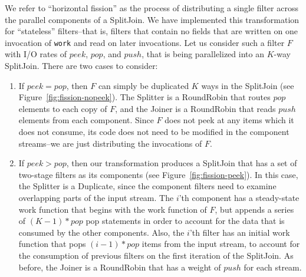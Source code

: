 We refer to ``horizontal fission'' as the process of distributing a
single filter across the parallel components of a SplitJoin.  We have
implemented this transformation for ``stateless'' filters--that is,
filters that contain no fields that are written on one invocation of
{\tt work} and read on later invocations.  Let us consider such a
filter $F$ with I/O rates of $peek$, $pop$, and $push$, that is being
parallelized into an $K$-way SplitJoin.  There are two cases to
consider:
\begin{enumerate}
\item If {\bf $peek = pop$}, then $F$ can simply be duplicated $K$
ways in the SplitJoin (see Figure~\ref{fig:fission-nopeek}).  The
Splitter is a RoundRobin that routes $pop$ elements to each copy of
$F$, and the Joiner is a RoundRobin that reads $push$ elements from
each component.  Since $F$ does not peek at any items which it does
not consume, its code does not need to be modified in the component
streams--we are just distributing the invocations of $F$.

\item If {\bf $peek > pop$}, then our transformation produces a
SplitJoin that has a set of two-stage filters as its components (see
Figure~\ref{fig:fission-peek}).  In this case, the Splitter is a
Duplicate, since the component filters need to examine overlapping
parts of the input stream.  The $i$'th component has a steady-state
work function that begins with the work function of $F$, but appends a
series of $(K-1)*pop$ pop statements in order to account for the data
that is consumed by the other components.  Also, the $i$'th filter has
an initial work function that pops $(i-1)*pop$ items from the input
stream, to account for the consumption of previous filters on the
first iteration of the SplitJoin.  As before, the Joiner is a
RoundRobin that has a weight of $push$ for each stream.
\end{enumerate}

